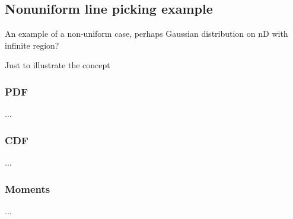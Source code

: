 \subsection{Nonuniform line picking example}
\label{sec:nonuniform_line}

An example of a non-uniform case, perhaps Gaussian distribution on nD
with infinite region?

Just to illustrate the concept


\subsubsection{PDF}


...

\subsubsection{CDF}

...


\subsubsection{Moments}

...



